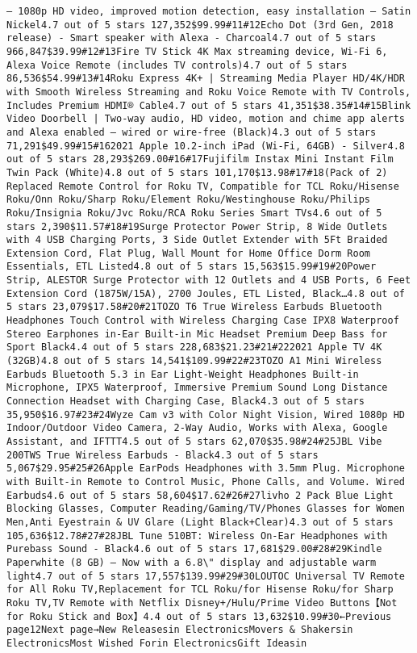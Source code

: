 \documentclass[
]{article}
\begin{document}
\begin{verbatim}
– 1080p HD video, improved motion detection, easy installation – Satin Nickel4.7 out of 5 stars 127,352$99.99#11#12Echo Dot (3rd Gen, 2018 release) - Smart speaker with Alexa - Charcoal4.7 out of 5 stars 966,847$39.99#12#13Fire TV Stick 4K Max streaming device, Wi-Fi 6, Alexa Voice Remote (includes TV controls)4.7 out of 5 stars 86,536$54.99#13#14Roku Express 4K+ | Streaming Media Player HD/4K/HDR with Smooth Wireless Streaming and Roku Voice Remote with TV Controls, Includes Premium HDMI® Cable4.7 out of 5 stars 41,351$38.35#14#15Blink Video Doorbell | Two-way audio, HD video, motion and chime app alerts and Alexa enabled — wired or wire-free (Black)4.3 out of 5 stars 71,291$49.99#15#162021 Apple 10.2-inch iPad (Wi-Fi, 64GB) - Silver4.8 out of 5 stars 28,293$269.00#16#17Fujifilm Instax Mini Instant Film Twin Pack (White)4.8 out of 5 stars 101,170$13.98#17#18(Pack of 2) Replaced Remote Control for Roku TV, Compatible for TCL Roku/Hisense Roku/Onn Roku/Sharp Roku/Element Roku/Westinghouse Roku/Philips Roku/Insignia Roku/Jvc Roku/RCA Roku Series Smart TVs4.6 out of 5 stars 2,390$11.57#18#19Surge Protector Power Strip, 8 Wide Outlets with 4 USB Charging Ports, 3 Side Outlet Extender with 5Ft Braided Extension Cord, Flat Plug, Wall Mount for Home Office Dorm Room Essentials, ETL Listed4.8 out of 5 stars 15,563$15.99#19#20Power Strip, ALESTOR Surge Protector with 12 Outlets and 4 USB Ports, 6 Feet Extension Cord (1875W/15A), 2700 Joules, ETL Listed, Black…4.8 out of 5 stars 23,079$17.58#20#21TOZO T6 True Wireless Earbuds Bluetooth Headphones Touch Control with Wireless Charging Case IPX8 Waterproof Stereo Earphones in-Ear Built-in Mic Headset Premium Deep Bass for Sport Black4.4 out of 5 stars 228,683$21.23#21#222021 Apple TV 4K (32GB)4.8 out of 5 stars 14,541$109.99#22#23TOZO A1 Mini Wireless Earbuds Bluetooth 5.3 in Ear Light-Weight Headphones Built-in Microphone, IPX5 Waterproof, Immersive Premium Sound Long Distance Connection Headset with Charging Case, Black4.3 out of 5 stars 35,950$16.97#23#24Wyze Cam v3 with Color Night Vision, Wired 1080p HD Indoor/Outdoor Video Camera, 2-Way Audio, Works with Alexa, Google Assistant, and IFTTT4.5 out of 5 stars 62,070$35.98#24#25JBL Vibe 200TWS True Wireless Earbuds - Black4.3 out of 5 stars 5,067$29.95#25#26Apple EarPods Headphones with 3.5mm Plug. Microphone with Built-in Remote to Control Music, Phone Calls, and Volume. Wired Earbuds4.6 out of 5 stars 58,604$17.62#26#27livho 2 Pack Blue Light Blocking Glasses, Computer Reading/Gaming/TV/Phones Glasses for Women Men,Anti Eyestrain & UV Glare (Light Black+Clear)4.3 out of 5 stars 105,636$12.78#27#28JBL Tune 510BT: Wireless On-Ear Headphones with Purebass Sound - Black4.6 out of 5 stars 17,681$29.00#28#29Kindle Paperwhite (8 GB) – Now with a 6.8\" display and adjustable warm light4.7 out of 5 stars 17,557$139.99#29#30LOUTOC Universal TV Remote for All Roku TV,Replacement for TCL Roku/for Hisense Roku/for Sharp Roku TV,TV Remote with Netflix Disney+/Hulu/Prime Video Buttons【Not for Roku Stick and Box】4.4 out of 5 stars 13,632$10.99#30←Previous page12Next page→New Releasesin ElectronicsMovers & Shakersin ElectronicsMost Wished Forin ElectronicsGift Ideasin 
\end{verbatim}
\end{document}
